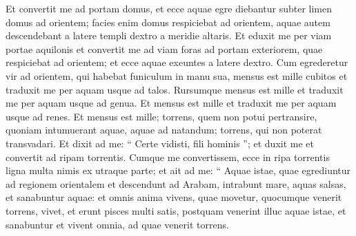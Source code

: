 \begin{biblechapter}
\begin{biblechapter}
\begin{biblechapter}
\begin{biblechapter}
\begin{biblechapter}
\begin{biblechapter}
\begin{biblechapter}
\begin{biblechapter}
\begin{biblechapter}
\begin{biblechapter}
\begin{biblechapter}
\begin{biblechapter}
\begin{biblechapter}
\begin{biblechapter}
\begin{biblechapter}
\begin{biblechapter}
\begin{biblechapter}
\begin{biblechapter}
\begin{biblechapter}
\begin{biblechapter}
\begin{biblechapter}
\begin{biblechapter}
\begin{biblechapter}
\begin{biblechapter}
\begin{biblechapter}
\begin{biblechapter}
\begin{biblechapter}
\begin{biblechapter}
\begin{biblechapter}
\begin{biblechapter}
\begin{biblechapter}
\begin{biblechapter}
\begin{biblechapter}
\begin{biblechapter}
\begin{biblechapter}
\begin{biblechapter}
\begin{biblechapter}
\begin{biblechapter}
\begin{biblechapter}
\begin{biblechapter}
\begin{biblechapter}
\begin{biblechapter}
\begin{biblechapter}
\begin{biblechapter}
\begin{biblechapter}
\begin{biblechapter}
\begin{biblechapter}
\verse Et convertit me ad portam domus, et ecce aquae egre diebantur subter limen domus ad orientem; facies enim domus respiciebat ad orientem, aquae autem descendebant a latere templi dextro a meridie altaris. 
\verse Et eduxit me per viam portae aquilonis et convertit me ad viam foras ad portam exteriorem, quae respiciebat ad orientem; et ecce aquae exeuntes a latere dextro. 
\verse Cum egrederetur vir ad orientem, qui habebat funiculum in manu sua, mensus est mille cubitos et traduxit me per aquam usque ad talos. 
\verse Rursumque mensus est mille et traduxit me per aquam usque ad genua. 
\verse Et mensus est mille et traduxit me per aquam usque ad renes. Et mensus est mille; torrens, quem non potui pertransire, quoniam intumuerant aquae, aquae ad natandum; torrens, qui non poterat transvadari. 
\verse Et dixit ad me: “ Certe vidisti, fili hominis ”; et duxit me et convertit ad ripam torrentis. 
\verse Cumque me convertissem, ecce in ripa torrentis ligna multa nimis ex utraque parte; 
\verse et ait ad me: “ Aquae istae, quae egrediuntur ad regionem orientalem et descendunt ad Arabam, intrabunt mare, aquas salsas, et sanabuntur aquae: 
\verse et omnis anima vivens, quae movetur, quocumque venerit torrens, vivet, et erunt pisces multi satis, postquam venerint illuc aquae istae, et sanabuntur et vivent omnia, ad quae venerit torrens. 

\end{biblechapter}
\end{biblechapter}
\end{biblechapter}
\end{biblechapter}
\end{biblechapter}
\end{biblechapter}
\end{biblechapter}
\end{biblechapter}
\end{biblechapter}
\end{biblechapter}
\end{biblechapter}
\end{biblechapter}
\end{biblechapter}
\end{biblechapter}
\end{biblechapter}
\end{biblechapter}
\end{biblechapter}
\end{biblechapter}
\end{biblechapter}
\end{biblechapter}
\end{biblechapter}
\end{biblechapter}
\end{biblechapter}
\end{biblechapter}
\end{biblechapter}
\end{biblechapter}
\end{biblechapter}
\end{biblechapter}
\end{biblechapter}
\end{biblechapter}
\end{biblechapter}
\end{biblechapter}
\end{biblechapter}
\end{biblechapter}
\end{biblechapter}
\end{biblechapter}
\end{biblechapter}
\end{biblechapter}
\end{biblechapter}
\end{biblechapter}
\end{biblechapter}
\end{biblechapter}
\end{biblechapter}
\end{biblechapter}
\end{biblechapter}
\end{biblechapter}
\end{biblechapter}
